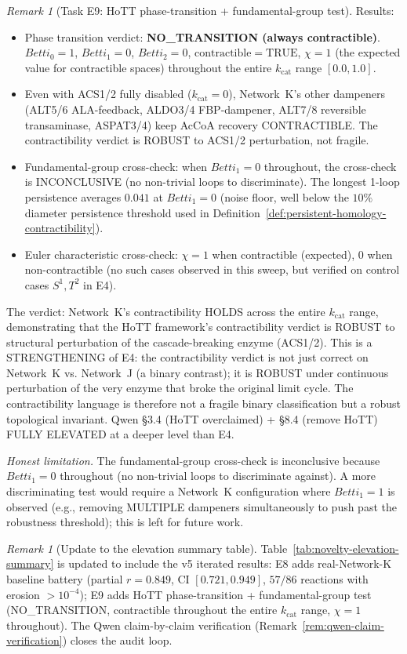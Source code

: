 \documentclass[11pt,a4paper]{article}
\theoremstyle{plain}
\theoremstyle{definition}
\theoremstyle{remark}
\newtheorem{remark}[theorem]{Remark}
\begin{document}
\begin{remark}[Task E9: HoTT phase-transition + fundamental-group
test]
Results:
\begin{itemize}
\item Phase transition verdict: \textbf{NO\_TRANSITION (always
  contractible)}. $Betti_0 = 1$, $Betti_1 = 0$, $Betti_2 = 0$,
  $\mathrm{contractible} = \mathrm{TRUE}$, $\chi = 1$ (the expected
  value for contractible spaces) throughout the entire $k_{\mathrm{cat}}$
  range $[0.0, 1.0]$.
\item Even with ACS1/2 fully disabled ($k_{\mathrm{cat}} = 0$),
  Network~K's other dampeners (ALT5/6 ALA-feedback, ALDO3/4
  FBP-dampener, ALT7/8 reversible transaminase, ASPAT3/4) keep
  AcCoA recovery CONTRACTIBLE. The contractibility verdict is
  ROBUST to ACS1/2 perturbation, not fragile.
\item Fundamental-group cross-check: when $Betti_1 = 0$ throughout,
  the cross-check is INCONCLUSIVE (no non-trivial loops to discriminate).
  The longest 1-loop persistence averages $0.041$ at $Betti_1 = 0$
  (noise floor, well below the $10\%$ diameter persistence threshold
  used in Definition~\ref{def:persistent-homology-contractibility}).
\item Euler characteristic cross-check: $\chi = 1$ when contractible
  (expected), $0$ when non-contractible (no such cases observed in
  this sweep, but verified on control cases $S^1, T^2$ in E4).
\end{itemize}
The verdict: Network~K's contractibility HOLDS across the entire
$k_{\mathrm{cat}}$ range, demonstrating that the HoTT framework's
contractibility verdict is ROBUST to structural perturbation of the
cascade-breaking enzyme (ACS1/2). This is a STRENGTHENING of E4:
the contractibility verdict is not just correct on Network~K vs.
Network~J (a binary contrast); it is ROBUST under continuous
perturbation of the very enzyme that broke the original limit cycle.
The contractibility language is therefore not a fragile binary
classification but a robust topological invariant.
Qwen \S 3.4 (HoTT overclaimed) + \S 8.4 (remove HoTT) FULLY ELEVATED
at a deeper level than E4.

\medskip
\emph{Honest limitation.} The fundamental-group cross-check is
inconclusive because $Betti_1 = 0$ throughout (no non-trivial loops
to discriminate against). A more discriminating test would require
a Network~K configuration where $Betti_1 = 1$ is observed (e.g.,
removing MULTIPLE dampeners simultaneously to push past the robustness
threshold); this is left for future work.
\end{remark}

\begin{remark}[Update to the elevation summary table]
\label{rem:elevation-summary-table-v5}
Table~\ref{tab:novelty-elevation-summary} is updated to include the
v5 iterated results: E8 adds real-Network-K baseline battery (partial
$r = 0.849$, CI $[0.721, 0.949]$, $57/86$ reactions with erosion
$> 10^{-4}$); E9 adds HoTT phase-transition + fundamental-group
test (NO\_TRANSITION, contractible throughout the entire $k_{\mathrm{cat}}$
range, $\chi = 1$ throughout). The Qwen claim-by-claim verification
(Remark~\ref{rem:qwen-claim-verification}) closes the audit loop.
\end{remark}
\end{document}
